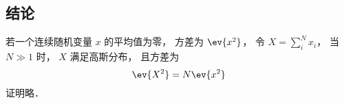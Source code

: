 
\begin{issues}
\issueDraft
\end{issues}

\subsection{结论}
若一个连续随机变量 $x$ 的平均值为零， 方差为 $\ev{x^2}$， 令 $X = \sum_i^N x_i$， 当 $N \gg 1$ 时， $X$ 满足高斯分布， 且方差为
\begin{equation}
\ev{X^2} = N\ev{x^2}
\end{equation}
证明略．